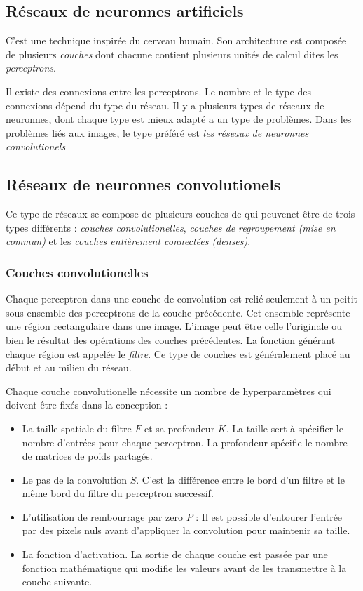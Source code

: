 \subsection{Réseaux de neuronnes artificiels}

C'est une technique inspirée du cerveau humain. Son architecture est composée de
plusieurs \emph{couches} dont chacune contient plusieurs unités de calcul dites
les \emph{perceptrons}.

Il existe des connexions entre les perceptrons. Le nombre et le type des
connexions dépend du type du réseau. Il y a plusieurs types de réseaux de
neuronnes, dont chaque type est mieux adapté a un type de problèmes. Dans les
problèmes liés aux images, le type préféré est \emph{les réseaux de neuronnes
convolutionels}

\subsection{Réseaux de neuronnes convolutionels}

Ce type de réseaux se compose de plusieurs couches de qui peuvenet être de trois
types différents : \emph{couches convolutionelles},
\emph{couches de regroupement (mise en commun)} et les
\emph{couches entièrement connectées (denses)}.

\subsubsection{Couches convolutionelles}

Chaque perceptron dans une couche de convolution est relié seulement à un peitit
sous ensemble des perceptrons de la couche précédente. Cet ensemble représente
une région rectangulaire dans une image. L'image peut être celle l'originale ou
bien le résultat des opérations des couches précédentes. La fonction générant
chaque région est appelée le \emph{filtre}. Ce type de couches est généralement
placé au début et au milieu du réseau.

Chaque couche convolutionelle nécessite un nombre de hyperparamètres qui doivent
être fixés dans la conception :

\begin{itemize}
  \item La taille spatiale du filtre $F$ et sa profondeur $K$. La taille sert à
  spécifier le nombre d'entrées pour chaque perceptron. La profondeur spécifie
  le nombre de matrices de poids partagés.
  \item Le pas de la convolution $S$. C'est la différence entre le bord d'un
  filtre et le même bord du filtre du perceptron successif.
  \item L'utilisation de rembourrage par zero $P$ : Il est possible d'entourer
  l'entrée par des pixels nuls avant d'appliquer la convolution pour maintenir
  sa taille.
  \item La fonction d'activation. La sortie de chaque couche est passée par une
  fonction mathématique qui modifie les valeurs avant de les transmettre à la
  couche suivante.
\end{itemize}

